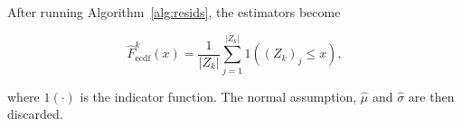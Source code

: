 \documentclass[11pt,twoside,openany]{book}
\numberwithin{Theorem}{chapter}
\numberwithin{Definition}{chapter}
\numberwithin{Lemma}{chapter}
\numberwithin{Algorithm}{chapter}
\numberwithin{equation}{chapter}
\begin{document}
After running Algorithm~\ref{alg:resids}, the estimators become

\[
  \hat F^k_{\text{ecdf}}(x) = \frac{1}{|Z_k|}\sum_{j=1}^{|Z_k|} 1\left((Z_k)_j \leq x\right),
\]

where $1(\cdot)$ is the indicator function. The normal assumption,
$\hat\mu$ and $\hat\sigma$ are then discarded.




\end{document}
